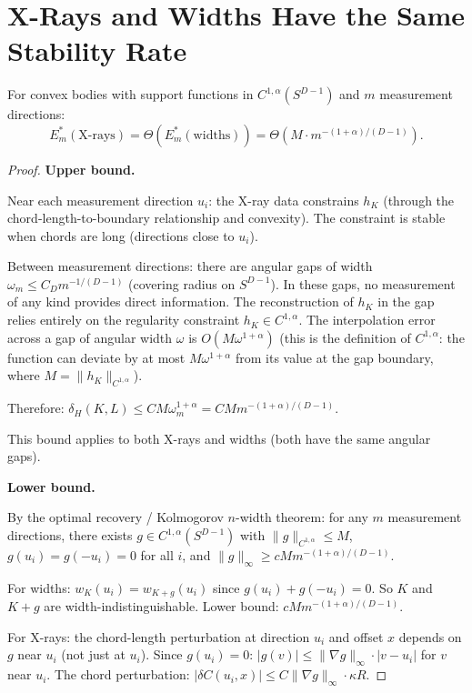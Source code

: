 \section{X-Rays and Widths Have the Same Stability Rate}

\begin{theorem}
\label{thm:final}
For convex bodies with support functions in $C^{1,\alpha}(S^{D-1})$ and $m$ measurement directions:
\[
  E_m^*(\mathrm{X\text{-}rays}) = \Theta(E_m^*(\mathrm{widths})) = \Theta(M \cdot m^{-(1+\alpha)/(D-1)}).
\]
\end{theorem}

\begin{proof}
\textbf{Upper bound.}

Near each measurement direction $u_i$: the X-ray data constrains $h_K$ (through the chord-length-to-boundary relationship and convexity). The constraint is stable when chords are long (directions close to $u_i$).

Between measurement directions: there are angular gaps of width $\omega_m \leq C_D m^{-1/(D-1)}$ (covering radius on $S^{D-1}$). In these gaps, no measurement of any kind provides direct information. The reconstruction of $h_K$ in the gap relies entirely on the regularity constraint $h_K \in C^{1,\alpha}$. The interpolation error across a gap of angular width $\omega$ is $O(M \omega^{1+\alpha})$ (this is the definition of $C^{1,\alpha}$: the function can deviate by at most $M\omega^{1+\alpha}$ from its value at the gap boundary, where $M = \|h_K\|_{C^{1,\alpha}}$).

Therefore: $\delta_H(K, L) \leq C M \omega_m^{1+\alpha} = C M m^{-(1+\alpha)/(D-1)}$.

This bound applies to both X-rays and widths (both have the same angular gaps).

\textbf{Lower bound.}

By the optimal recovery / Kolmogorov $n$-width theorem: for any $m$ measurement directions, there exists $g \in C^{1,\alpha}(S^{D-1})$ with $\|g\|_{C^{1,\alpha}} \leq M$, $g(u_i) = g(-u_i) = 0$ for all $i$, and $\|g\|_\infty \geq c M m^{-(1+\alpha)/(D-1)}$.

For widths: $w_K(u_i) = w_{K+g}(u_i)$ since $g(u_i) + g(-u_i) = 0$. So $K$ and $K+g$ are width-indistinguishable. Lower bound: $c M m^{-(1+\alpha)/(D-1)}$.

For X-rays: the chord-length perturbation at direction $u_i$ and offset $x$ depends on $g$ near $u_i$ (not just at $u_i$). Since $g(u_i) = 0$: $|g(v)| \leq \|\nabla g\|_\infty \cdot |v - u_i|$ for $v$ near $u_i$. The chord perturbation: $|\delta C(u_i, x)| \leq C \|\nabla g\|_\infty \cdot \kappa R$.


\end{proof}
